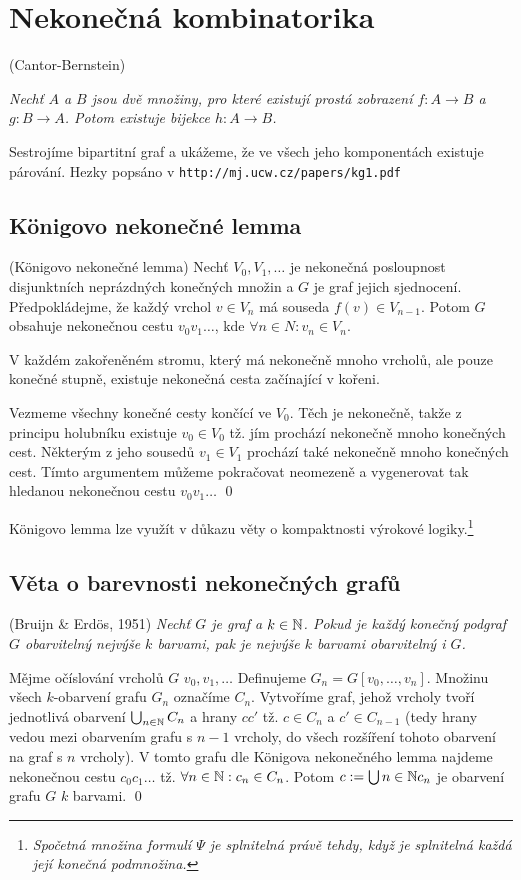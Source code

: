 \section{Nekonečná kombinatorika}

\vt (Cantor-Bernstein) {\it Nechť $A$ a $B$ jsou dvě množiny, pro které existují prostá zobrazení $f: A \rightarrow B$ a $g: B \rightarrow A$. Potom existuje bijekce $h: A \rightarrow B$.

\dk Sestrojíme bipartitní graf a ukážeme, že ve všech jeho komponentách existuje párování. Hezky popsáno v \texttt{http://mj.ucw.cz/papers/kg1.pdf}

\subsection{Königovo nekonečné lemma}

\lm (Königovo nekonečné lemma) Nechť $V_0,V_1,\dots$ je nekonečná posloupnost disjunktních neprázdných konečných množin a $G$ je graf jejich sjednocení. Předpokládejme, že každý vrchol $v \in V_n$ má souseda $f(v) \in V_{n-1}$. Potom $G$ obsahuje nekonečnou cestu $v_0v_1\dots$, kde $\forall n\in N: v_n\in V_n$.

\medskip{} V každém zakořeněném stromu, který má nekonečně mnoho vrcholů, ale pouze konečné stupně, existuje nekonečná cesta začínající v kořeni.

\dk Vezmeme všechny konečné cesty končící ve $V_0$. Těch je nekonečně, takže z principu holubníku existuje $v_0\in V_0$ tž. jím prochází nekonečně mnoho konečných cest. Některým z jeho sousedů $v_1\in V_1$ prochází také nekonečně mnoho konečných cest. Tímto argumentem můžeme pokračovat neomezeně a vygenerovat tak hledanou nekonečnou cestu $v_0v_1\dots$
\qed

Königovo lemma lze využít v důkazu věty o kompaktnosti výrokové logiky.\footnote{\it Spočetná množina formulí $\Psi$ je splnitelná právě tehdy, když je splnitelná každá její konečná podmnožina.}

\subsection{Věta o barevnosti nekonečných grafů}

\vt (Bruijn \& Erdös, 1951) {\it Nechť $G$ je graf a $k\in \mathbb{N}$. Pokud je každý konečný podgraf $G$ obarvitelný nejvýše $k$ barvami, pak je nejvýše $k$ barvami obarvitelný i $G$.}

\dk Mějme očíslování vrcholů $G$ $v_0, v_1, \dots$ Definujeme $G_n = G[v_0,\dots, v_n]$. Množinu všech $k$-obarvení grafu $G_n$ označíme $C_n$. Vytvoříme graf, jehož vrcholy tvoří jednotlivá obarvení $\bigcup_{n\in\mathbb{N}} C_n$ a hrany $cc'$ tž. $c\in C_n$ a $c'\in C_{n-1}$ (tedy hrany vedou mezi obarvením grafu s $n-1$ vrcholy, do všech rozšíření tohoto obarvení na graf s $n$ vrcholy). V tomto grafu dle Königova nekonečného lemma najdeme nekonečnou cestu $c_0c_1\dots$ tž. $\forall n\in\mathbb{N}: c_n \in C_n$. Potom $c := \bigcup{n\in\mathbb{N}}c_n$ je obarvení grafu $G$ $k$ barvami.
\qed

}
